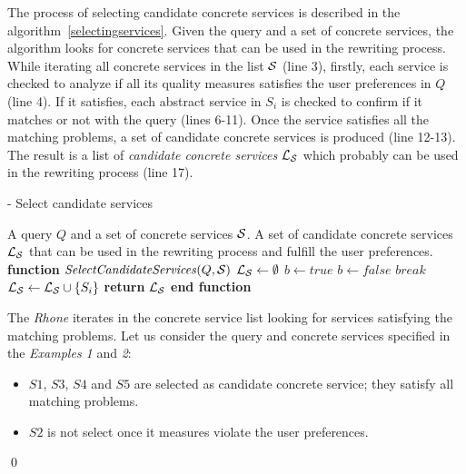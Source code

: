 The process of selecting candidate concrete services
is described in the algorithm~\ref{selectingservices}.
Given the query and a set of concrete services, the algorithm
looks for concrete services that can be used in the rewriting process.
While iterating all concrete services in the list $\hbox{${\cal S}$}$ (line 3), firstly,
each service is checked to analyze if all its quality measures satisfies the user preferences
in $Q$ (line 4). If it satisfies, each abstract service in $S_{i}$ is checked to confirm if 
it matches or not with the query (lines 6-11). Once the service satisfies all the matching 
problems, a set of candidate concrete services is produced (line 12-13). The result
is a list of \textit{candidate concrete services} $\hbox{${\cal L_{S}}$}$ which
probably can be used in the rewriting process (line 17).

\begin{algorithm}
\caption{ - Select candidate services}
\label{selectingservices}
\begin{algorithmic}[1]
\REQUIRE A query $Q$ and a set of concrete services $\hbox{${\cal S}$}$.
\ENSURE A set of candidate concrete services $\hbox{${\cal L_{S}}$}$ that can be used in the rewriting process and fulfill the user preferences.
\STATE \textbf{function} $\mathit{SelectCandidateServices} (Q, \hbox{${\cal S}$})$
\STATE $\hbox{${\cal L_{S}}$} \leftarrow \emptyset$
		\STATE $b \leftarrow \mathit{true}$		
				\STATE $b \leftarrow \mathit{false}$	
				\STATE $\mathit{break}$
			\ENDIF
		\ENDFOR
			\STATE $\hbox{${\cal L_{S}}$} \leftarrow \hbox{${\cal L_{S}}$} \cup \lbrace S_{i} \rbrace$	
		\ENDIF
	\ENDIF
\ENDFOR
\STATE \textbf{return} $\hbox{${\cal L_{S}}$}$
\STATE \textbf{end function}
\end{algorithmic}
\end{algorithm}

\begin{example}
The \textit{Rhone} iterates in the concrete service list looking for services satisfying the matching problems.
Let us consider the query and concrete services specified in the \textit{Examples 1} and \textit{2}:  
\begin{itemize}
\item $S1$, $S3$, $S4$ and $S5$ are selected as candidate concrete service; they satisfy all matching problems.
\item $S2$ is not select once it measures violate the user preferences.
\end{itemize}
\qed
\end{example}

